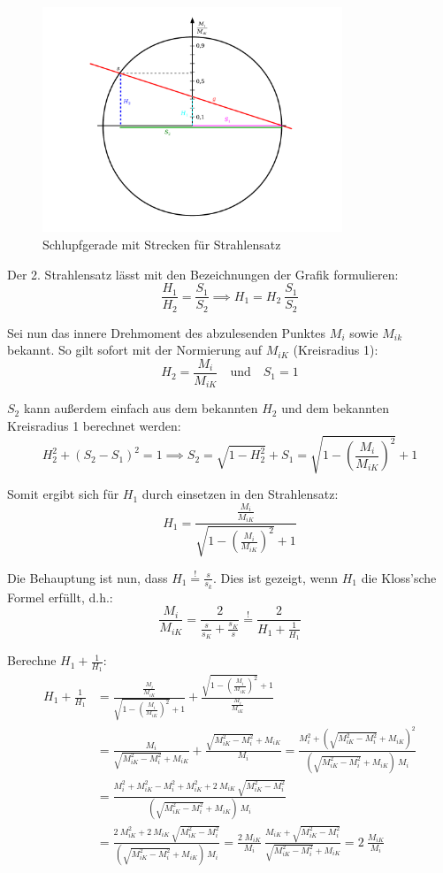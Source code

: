 \documentclass[11pt]{article}
\begin{document}
\begin{figure}[H]
	\centering
	\includegraphics[width=0.8\textwidth]{img/asynchronmaschine_schlupfgerade.pdf}
	\caption*{Schlupfgerade mit Strecken für Strahlensatz}
\end{figure}

Der 2. Strahlensatz lässt mit den Bezeichnungen der Grafik formulieren:
\[
	\frac{H_1}{H_2} = \frac{S_1}{S_2} \implies H_1 = H_2 ~ \frac{S_1}{S_2}
\]

Sei nun das innere Drehmoment des abzulesenden Punktes $M_i$ sowie $M_{ik}$ bekannt. So gilt sofort mit der Normierung auf $M_{iK}$ (Kreisradius 1):
\[
	H_2 = \frac{M_i}{M_{iK}} \quad \mathrm{und} \quad S_1 = 1
\]

$S_2$ kann außerdem einfach aus dem bekannten $H_2$ und dem bekannten Kreisradius 1 berechnet werden:
\[
	H_2^2 + (S_2 - S_1)^2 = 1 \implies S_2 = \sqrt{1 - H_2^2} + S_1 = \sqrt{1 - \left( \frac{M_i}{M_{iK}} \right)^2} + 1
\]

Somit ergibt sich für $H_1$ durch einsetzen in den Strahlensatz:
\[
	H_1 = \frac{\frac{M_i}{M_{iK}}}{\sqrt{1 - \left( \frac{M_i}{M_{iK}} \right)^2} + 1}
\]

Die Behauptung ist nun, dass $H_1 \overset{!}{=} \frac{s}{s_k}$. Dies ist gezeigt, wenn $H_1$ die Kloss'sche Formel erfüllt, d.h.:
\[
	\frac{M_i}{M_{iK}} = \frac{2}{\frac{s}{s_K} + \frac{s_K}{s}} \overset{!}{=} \frac{2}{H_1 + \frac{1}{H_1}}
\]

Berechne $H_1 + \frac{1}{H_1}$:
\begin{align*}
H_1 + \frac{1}{H_1}
		&= \frac{\frac{M_i}{M_{iK}}}{\sqrt{1 - \left( \frac{M_i}{M_{iK}} \right)^2} + 1} + \frac{\sqrt{1 - \left( \frac{M_i}{M_{iK}} \right)^2} + 1}{\frac{M_i}{M_{iK}}} \\
		&= \frac{M_i}{\sqrt{M_{iK}^2 - M_i^2} + M_{iK}} + \frac{\sqrt{M_{iK}^2 - M_i^2} + M_{iK}}{M_i} = \frac{M_i^2 + \left(\sqrt{M_{iK}^2 - M_i^2} + M_{iK}\right)^2}{\left(\sqrt{M_{iK}^2 - M_i^2} + M_{iK}\right)~M_i} \\
		&= \frac{M_i^2 + M_{iK}^2 - M_i^2 + M_{iK}^2 + 2 ~ M_{iK} ~ \sqrt{M_{iK}^2 - M_i^2}}{\left(\sqrt{M_{iK}^2 - M_i^2} + M_{iK}\right)~M_i} \\
		&= \frac{2 ~ M_{iK}^2 + 2 ~ M_{iK} ~ \sqrt{M_{iK}^2 - M_i^2}}{\left(\sqrt{M_{iK}^2 - M_i^2} + M_{iK}\right)~M_i} = \frac{2 \; M_{iK}}{M_i} ~ \frac{M_{iK} + \sqrt{M_{iK}^2 - M_i^2}}{\sqrt{M_{iK}^2 - M_i^2} + M_{iK}} = 2 ~ \frac{M_{iK}}{M_i}
\end{align*}
\end{document}
